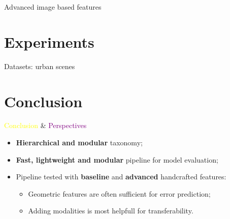 \documentclass[12pt]{beamer}
\begin{document}
            \begin{frame}{Advanced image based features}
                
            \end{frame}

    \section{Experiments}
        \begin{frame}{Datasets: urban scenes}
            \centering
            
        \end{frame}
        
    \section{Conclusion}
        \begin{frame}{\textcolor{yellow}{Conclusion} \& \textcolor{purple}{Perspectives}}
            \begin{itemize}[label=\(\blacktriangleright\), font=\color{yellow}, itemsep=2em]
                \item<1-> \textbf{Hierarchical and modular} taxonomy;
                \item<2-> \textbf{Fast, lightweight and modular} pipeline for model evaluation;
                \item<3-> Pipeline tested with \textbf{baseline} and \textbf{advanced} handcrafted features:
                    \begin{itemize}[label=\(\blacktriangleright\), font=\color{IGNGreen}]
                        \item<4-> Geometric features are often sufficient for error prediction;
                        \item<5-> Adding modalities is most helpfull for transferability.
                    \end{itemize}
            \end{itemize}
        \end{frame}
\end{document}
